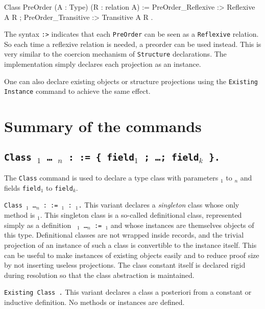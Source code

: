 \begin{coq_example*}
Class PreOrder (A : Type) (R : relation A) :=
{ PreOrder_Reflexive :> Reflexive A R ;
  PreOrder_Transitive :> Transitive A R }.
\end{coq_example*}

The syntax \texttt{:>} indicates that each \texttt{PreOrder} can be seen
as a \texttt{Reflexive} relation. So each time a reflexive relation is
needed, a preorder can be used instead. This is very similar to the
coercion mechanism of \texttt{Structure} declarations.
The implementation simply declares each projection as an instance. 

One can also declare existing objects or structure
projections using the \texttt{Existing Instance} command to achieve the 
same effect.

\section{Summary of the commands
\label{TypeClassCommands}}

\subsection{\tt Class {\ident} {\binder$_1$ \ldots~\binder$_n$} 
  : \sort := \{ field$_1$ ; \ldots ; field$_k$ \}.}
\label{Class}

The \texttt{Class} command is used to declare a type class with
parameters {\binder$_1$} to {\binder$_n$} and fields {\tt field$_1$} to
{\tt field$_k$}.

\begin{Variants}
\item \label{SingletonClass} {\tt Class {\ident} {\binder$_1$ \ldots \binder$_n$} 
    : \sort := \ident$_1$ : \type$_1$.}
  This variant declares a \emph{singleton} class whose only method is
  {\tt \ident$_1$}. This singleton class is a so-called definitional
  class, represented simply as a definition 
  {\tt {\ident} \binder$_1$ \ldots \binder$_n$ := \type$_1$} and whose
  instances are themselves objects of this type. Definitional classes
  are not wrapped inside records, and the trivial projection of an
  instance of such a class is convertible to the instance itself. This can
  be useful to make instances of existing objects easily and to reduce 
  proof size by not inserting useless projections. The class
  constant itself is declared rigid during resolution so that the class 
  abstraction is maintained.  

\item \label{ExistingClass} {\tt Existing Class {\ident}.}
  This variant declares a class a posteriori from a constant or
  inductive definition. No methods or instances are defined.
\end{Variants}

